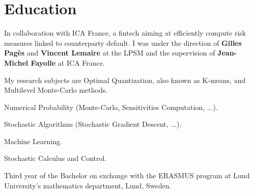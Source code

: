 \documentclass[]{deedy-resume-openfont}
\begin{document}
\begin{minipage}[t]{0.66\textwidth}


	\vspace{\topsep}
	\vspace{\topsep}

	\section{Education}

	In collaboration with ICA France, a fintech aiming at efficiently compute risk measures linked to counterparty default. I was under the direction of \textbf{Gilles Pagès} and \textbf{Vincent Lemaire} at the LPSM and the supervision of \textbf{Jean-Michel Fayolle} at ICA France.

	My research subjects are Optimal Quantization, also known as K-means, and Multilevel Monte-Carlo methods.
	\sectionsep


	\vspace{\topsep}
	\begin{tightemize}
		\item Numerical Probability (Monte-Carlo, Sensitivities Computation, $\dots$).
		\item Stochastic Algorithms (Stochastic Gradient Descent, $\dots$).
		\item Machine Learning.
		\item Stochastic Calculus and Control.
	\end{tightemize}
	\sectionsep


	Third year of the Bachelor on exchange with the ERASMUS program at Lund University's mathematics department, Lund, Sweden.




\end{minipage}
\end{document}
